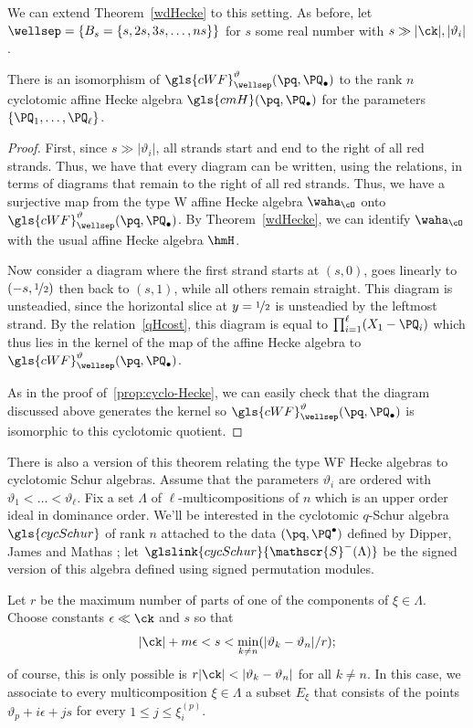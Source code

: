 We can extend Theorem~\ref{wdHecke} to this setting. As before, let
$\wellsep=\{B_s=\{s,2s,3s,\dots, ns\}\}$ for $s$ some real
number with $s\gg |\ck|,|\vartheta_i|$. 
\begin{theorem}\label{wfHecke}
 There is an isomorphism of $\gls{cWF}^\vartheta_\wellsep
 (\pq,\PQ_{\bullet})$ to the rank $n$ cyclotomic affine Hecke algebra
 $\gls{cmH}(\pq,\PQ_\bullet)$ for the 
 parameters $\{\PQ_1,\dots, \PQ_\ell\}$. 
\end{theorem}
\begin{proof}
 First, since $s\gg |\vartheta_i|$, all strands start and end to the
 right of all red strands. Thus, we have that every diagram can be
 written, using the relations, in terms of diagrams that remain to
 the right of all red strands. Thus, we have a surjective map from
 the type W affine Hecke algebra $\waha_\cO$ onto $\gls{cWF}^\vartheta_\wellsep
 (\pq,\PQ_{\bullet})$. 
By Theorem~\ref{wdHecke}, we can identify $\waha_\cO$ with the usual
affine Hecke algebra $\hmH$. 

Now consider a diagram
where the first strand starts at $(s,0)$, goes linearly to
$(-s,\nicefrac 12)$ then back to $(s,1)$, while all others remain
straight. This diagram is unsteadied, since the horizontal slice at
$y=\nicefrac{1}2$ is unsteadied by the leftmost strand. By the relation~\eqref{qHcost}, this diagram is equal to $\prod_{i=1}^\ell
 (X_1-\PQ_i)$ which thus lies in the kernel of the map of the affine
 Hecke algebra to $\gls{cWF}^\vartheta_\wellsep
 (\pq,\PQ_{\bullet})$. 

 As in the proof of~\ref{prop:cyclo-Hecke}, we can easily check that
 the diagram discussed above generates the kernel so $\gls{cWF}^\vartheta_\wellsep (\pq,\PQ_{\bullet})$ is isomorphic to
 this cyclotomic quotient.
\end{proof}

There is also a version of this theorem relating the type WF Hecke
algebras to cyclotomic Schur algebras. Assume that the parameters
$\vartheta_i$ are ordered with $\vartheta_1<\dots <\vartheta_\ell$.
Fix a set $\Lambda$ of $\ell$-multicompositions of $n$ which is an
upper order ideal in dominance order. We'll be interested in the
cyclotomic $q$-Schur algebra $\gls{cycSchur}$ of rank $n$ attached to the
data $(\pq,\PQ^\bullet)$ defined by Dipper, James and Mathas
\cite[6.1]{DJM}; let $ \glslink{cycSchur}{\mathscr{S}^-(\Lambda)}$ be the signed version of
this algebra defined using signed permutation modules.

Let $r$ be
the maximum number of parts of one of the components of $\xi\in
\Lambda$. Choose constants $\epsilon \ll \ck$ and $s$ so
that \[|\ck|+m\epsilon < s < \min_{k\neq
 n}(|\vartheta_k-\vartheta_n|/r);\] of course, this is only possible
is $r|\ck| <|\vartheta_k-\vartheta_n|$ for all $k\neq n$. In this
case, we associate to every multicomposition $\xi\in \Lambda$ a subset $E_\xi$
that consists of the points $\vartheta_p+i\epsilon+js$ for every
$1\leq j\leq \xi^{(p)}_i$.

